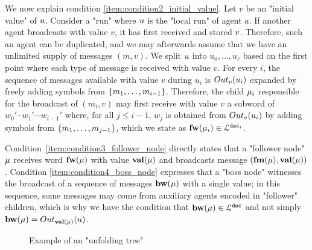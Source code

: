 We now explain condition \ref{item:condition2_initial_value}. Let $v$ be an "initial value" of $u$. Consider a "run" where $u$ is the "local run" of agent $a$. If another agent broadcasts with value $v$, it has first received and stored $v$. Therefore, such an agent can be duplicated, and we may afterwards assume that we have an unlimited supply of messages $(m,v)$.
We split $u$ into $u_0,\dots,u_\ell$ based on the first point where each type of message is received with value $v$. For every $i$, the sequence of messages available with value $v$ during $u_i$ is $\voutput{v}{u_i}$ expanded by freely adding symbols from $\{m_1,\dots, m_{i-1}\}$. Therefore, the child $\mu_i$ responsible for the broadcast of $(m_i,v)$ may first receive with value $v$ a subword of $w_0' \cdot w_1' \cdots w_{i-1}'$ where, for all $j \leq i-1$, $w_j$ is obtained from $\voutput{v}{u_i}$ by adding symbols from $\{m_1, \dots, m_{j-1}\}$, which we state as $\mathbf{fw}(\mu_i) \in \mathcal{L}^{\mathtt{\mathtt{dec}_i}}$.   

Condition~\ref{item:condition3_follower_node} directly states that a "follower node" $\mu$ receives word $\mathbf{fw}(\mu)$ with value $\mathbf{val}(\mu)$ and broadcasts message $(\mathbf{fm}(\mu), \mathbf{val}(\mu))$. Condition \ref{item:condition4_boss_node} expresses that a "boss node" witnesses the broadcast of a sequence of messages $\mathbf{bw}(\mu)$ with a single value; in this sequence, some messages may come from auxiliary agents encoded in "follower" children, which is why we have the condition that $\mathbf{bw}(\mu) \in \mathcal{L}^{\mathtt{\mathtt{dec}}}$ and not simply $\bosslabel{\node} = \voutput{\valuelabel{\node}}{\localrun}$. 




\begin{figure}
	\begin{center}
	\resizebox{\textwidth}{!}{
		
	}
	\end{center}
	\caption{Example of an "unfolding tree"}\label{fig-ex-unfolding-tree}
\end{figure}

